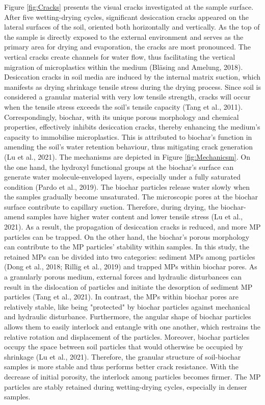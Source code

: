 Figure \ref{fig:Cracks} presents the visual cracks investigated at the sample surface. After five wetting-drying cycles, significant desiccation cracks appeared on the lateral surfaces of the soil, oriented both horizontally and vertically. As the top of the sample is directly exposed to the external environment and serves as the primary area for drying and evaporation, the cracks are most pronounced. The vertical cracks create channels for water flow, thus facilitating the vertical migration of microplastics within the medium (Bläsing and Amelung, 2018). Desiccation cracks in soil media are induced by the internal matrix suction, which manifests as drying shrinkage tensile stress during the drying process. Since soil is considered a granular material with very low tensile strength, cracks will occur when the tensile stress exceeds the soil's tensile capacity (Tang et al., 2011). Correspondingly, biochar, with its unique porous morphology and chemical properties, effectively inhibits desiccation cracks, thereby enhancing the medium's capacity to immobilise microplastics. This is attributed to biochar’s function in amending the soil’s water retention behaviour, thus mitigating crack generation (Lu et al., 2021). The mechanisms are depicted in Figure \ref{fig:Mechanicsm}. On the one hand, the hydroxyl functional groups at the biochar's surface can generate water molecule-enveloped layers, especially under a fully saturated condition (Pardo et al., 2019). The biochar particles release water slowly when the samples gradually become unsaturated. The microscopic pores at the biochar surface contribute to capillary suction. Therefore, during drying, the biochar-amend samples have higher water content and lower tensile stress (Lu et al., 2021). As a result, the propagation of desiccation cracks is reduced, and more MP particles can be trapped. On the other hand, the biochar's porous morphology can contribute to the MP particles’ stability within samples. In this study, the retained MPs can be divided into two categories: sediment MPs among particles (Dong et al., 2018; Rillig et al., 2019) and trapped MPs within biochar pores. As a granularly porous medium, external forces and hydraulic disturbances can result in the dislocation of particles and initiate the desorption of sediment MP particles (Tang et al., 2021). In contrast, the MPs within biochar pores are relatively stable, like being "protected" by biochar particles against mechanical and hydraulic disturbance. Furthermore, the angular shape of biochar particles allows them to easily interlock and entangle with one another, which restrains the relative rotation and displacement of the particles. Moreover, biochar particles occupy the space between soil particles that would otherwise be occupied by shrinkage (Lu et al., 2021). Therefore, the granular structure of soil-biochar samples is more stable and thus performs better crack resistance. With the decrease of initial porosity, the interlock among particles becomes firmer. The MP particles are stably retained during wetting-drying cycles, especially in denser samples. \par
